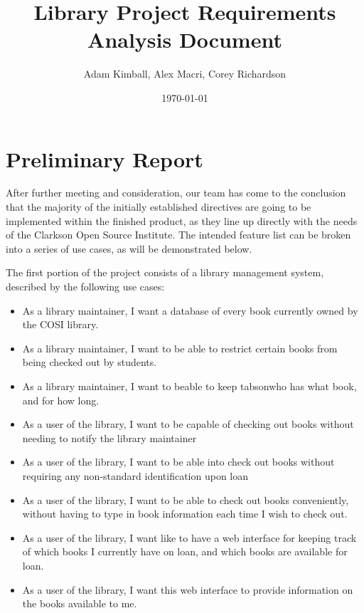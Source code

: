 \documentclass[a4paper, 10pt, oneside, draft]{article}
\title{Library Project Requirements Analysis Document}
\date{\today}
\author{Adam Kimball, Alex Macri, Corey Richardson}
\begin{document}
\maketitle
\newpage

\tableofcontents
\newpage

\section{Preliminary Report}

After further meeting and consideration, our team has come to the conclusion that the majority of the 
initially established directives are going to be implemented within the finished product, as they line
up directly with the needs of the Clarkson Open Source Institute. The intended feature list can be broken
into a series of use cases, as will be demonstrated below.

The first portion of the project consists of a library management system, described by the following use
cases:

\begin{itemize}
	\item As a library maintainer, I want a database of every book currently owned by the COSI library.
	\item As a library maintainer, I want to be able to restrict certain books from being checked out by students.
	\item As a library maintainer, I want to beable to keep tabsonwho has what book, and for how long.
	\item As a user of the library, I want to be capable of checking out books without needing to notify the library maintainer
	\item As a user of the library, I want to be able into check out books without requiring any non-standard identification upon loan
	\item As a user of the library, I want to be able to check out books conveniently, without having to type in book information each time I wish to check out.
	\item As a user of the library, I want like to have a web interface for keeping track of which books I currently have on loan, and which books are
available for loan.
	\item As a user of the library, I want this web interface to provide information on the books available to me.

\end{itemize}
\end{document}
